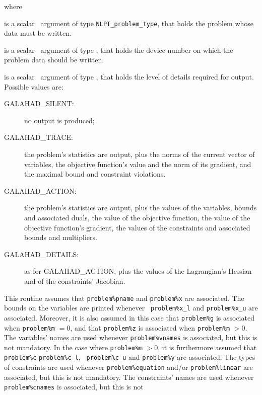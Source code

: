 \documentclass{galahad}
\newcommand{\sym}{\sf\small}
\begin{document}
\noindent where
\begin{description}
 is a scalar \intentin\ argument of type {\tt NLPT\_problem\_type},
that holds the problem whose data must be written.

 is a scalar \intentin\ argument of type \integer, that
holds the device number on which the problem data should be written.

 is a scalar \intentin\ argument of type \integer,
that holds the level of details required for output. Possible values are:
\begin{description}
\item[\sym GALAHAD\_SILENT:] no output is produced;
\item[\sym GALAHAD\_TRACE:] the problem's statistics are output, plus the
norms of the current vector of variables, the objective function's value and
the norm of its gradient, and the maximal bound and constraint violations.
\item[\sym GALAHAD\_ACTION:] the problem's statistics are output, plus the
values of the variables, bounds and associated duals, the value of the
objective function, the value of the objective function's gradient, the values
of the constraints and associated bounds and multipliers.
\item[\sym GALAHAD\_DETAILS:] as for {\sym GALAHAD\_ACTION}, plus the values
of the Lagrangian's Hessian and of the constraints' Jacobian.
\end{description}

\noindent
This routine assumes that {\tt problem\%pname} and {\tt problem\%x} are
associated. The bounds on the variables are printed whenever {\tt
problem\%x\_l} and {\tt problem\%x\_u} are associated. Moreover, it is also
assumed in this case that {\tt problem\%g} is associated when {\tt problem\%m}
$= 0$, and that {\tt problem\%z} is associated when {\tt problem\%m} $> 0$.
The variables' names are used whenever {\tt problem\%vnames} is associated,
but this is not mandatory. In the case where {\tt problem\%m} $>0$, it is
furthermore assumed that {\tt problem\%c} {\tt problem\%c\_l}, {\tt
problem\%c\_u} and {\tt problem\%y} are associated.  The types of constraints
are used whenever {\tt problem\%equation} and/or {\tt problem\%linear} are
associated, but this is not mandatory.  The constraints' names are used
whenever {\tt problem\%cnames} is associated, but this is not

\end{description}
\end{document}
